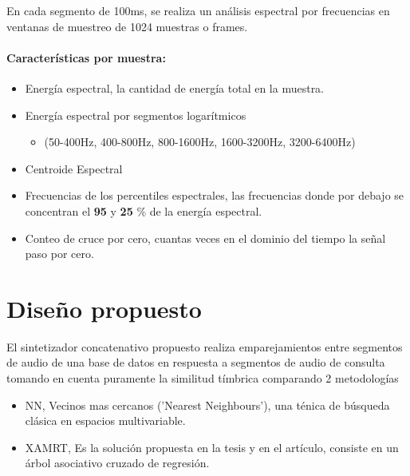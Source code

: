 \documentclass[runningheads]{llncs}
\begin{document}
En cada segmento de 100ms, se realiza un análisis espectral por frecuencias en ventanas de muestreo de 1024 muestras o frames. 
\paragraph{\textbf{Características por muestra:}}
\begin{itemize}
	\item Energía espectral, la cantidad de energía total en la muestra.
	\item Energía espectral por segmentos logarítmicos \begin{itemize}
		\item (50-400Hz, 400-800Hz, 800-1600Hz, 1600-3200Hz, 3200-6400Hz)
		\end{itemize}
	\item Centroide Espectral
	\item Frecuencias de los percentiles espectrales, las frecuencias donde por debajo se concentran el \textbf{95} y \textbf{25} \% de la energía espectral.
	\item Conteo de cruce por cero, cuantas veces en el dominio del tiempo la señal paso por cero.
\end{itemize}
\section{Diseño propuesto}
El sintetizador concatenativo propuesto realiza emparejamientos entre segmentos de audio de una base de datos en respuesta a segmentos de audio de consulta tomando en cuenta puramente la similitud tímbrica comparando 2 metodologías
\begin{itemize}
	\item NN, Vecinos mas cercanos ('Nearest Neighbours'), una ténica de búsqueda clásica en espacios multivariable.
	\item XAMRT, Es la solución propuesta en la tesis y en el artículo, consiste en un árbol asociativo cruzado de regresión. 
\end{itemize}
\end{document}
